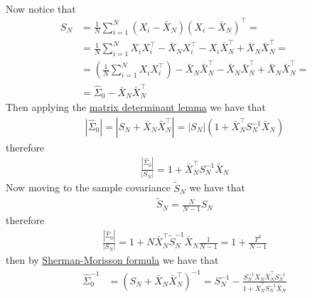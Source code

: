 \documentclass[10pt,notitlepage]{article}
\newcommand{\abs}[1]{\left\vert#1\right\vert}
\begin{document}
\begin{exercise}[Solution]
\begin{enumerate}[(a)]
\begin{align*}
                    \end{align*}
                    Now notice that
                    \begin{align*}
                        S_N &= \frac{1}{N}\sum_{i=1}^{N}\left(X_i-\bar{X}_N\right)\left(X_i-\bar{X}_N\right)^\top = \\
                        &= \frac{1}{N}\sum_{i=1}^{N}X_i X_i^\top - \bar{X}_N X_i^\top - X_i\bar{X}_N^\top + \bar{X}_N\bar{X}_N^\top = \\
                        &= \left(\frac{1}{N}\sum_{i=1}^{N}X_i X_i^\top\right) - \bar{X}_N \bar{X}_N^\top - \bar{X}_N \bar{X}_N^\top + \bar{X}_N\bar{X}_N^\top = \\
                        &= \hat{\Sigma}_0 - \bar{X}_N \bar{X}_N^\top
                    \end{align*}
                    Then applying the \href{https://en.wikipedia.org/wiki/Matrix_determinant_lemma}{matrix determinant lemma} we have that
                    \begin{align*}
                        \abs{\hat{\Sigma}_0} = \abs{S_N + \bar{X}_N \bar{X}_N^\top} = \abs{S_N}\left(1+\bar{X}_N^\top S_N^{-1}\bar{X}_N\right)
                    \end{align*}
                    therefore
                    \begin{align*}
                        \frac{\abs{\hat{\Sigma}_0}}{\abs{S_N}} = 1+\bar{X}_N^\top S_N^{-1}\bar{X}_N
                    \end{align*}
                    Now moving to the sample covariance $\tilde{S}_N$ we have that
                    \begin{align*}
                        \tilde{S}_N = \frac{N}{N-1}S_N
                    \end{align*}
                    therefore
                    \begin{align*}
                        \frac{\abs{\hat{\Sigma}_0}}{\abs{S_N}} = 1+N\bar{X}_N^\top \tilde{S}_N^{-1}\bar{X}_N\frac{1}{N-1}= 1+\frac{T^2}{N-1}
                    \end{align*}
                    then by \href{https://en.wikipedia.org/wiki/Sherman%E2%80%93Morrison_formula}{Sherman-Morisson formula} we have that
                    \begin{align*}
                        \hat{\Sigma}_0^{-1} &= \left(S_N + \bar{X}_N \bar{X}_N^\top\right)^{-1} = S_N^{-1} - \frac{S_N^{-1}\bar{X}_N \bar{X}_N^\top S_N^{-1}}{1+ \bar{X}_N^\top S_N^{-1}\bar{X}_N}
                    \end{align*}

\end{enumerate}
\end{exercise}
\end{document}
